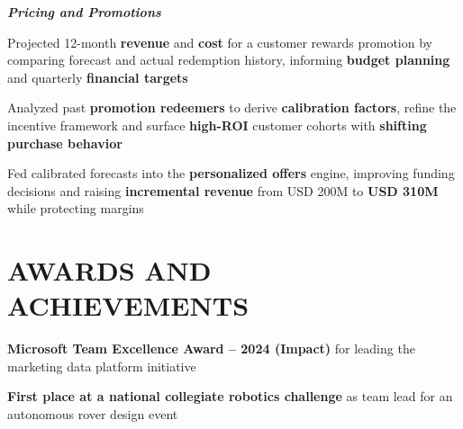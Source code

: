     \vspace{0.15 cm}
    \begin{onecolentry}
        \textit{\textbf{Pricing and Promotions}}
    \end{onecolentry}
    \begin{onecolentry}
        \begin{highlights}
            \item Projected 12-month \textbf{revenue} and \textbf{cost} for a customer rewards promotion by comparing forecast and actual redemption history, informing \textbf{budget planning} and quarterly \textbf{financial targets}
            \item Analyzed past \textbf{promotion redeemers} to derive \textbf{calibration factors}, refine the incentive framework and surface \textbf{high-ROI} customer cohorts with \textbf{shifting purchase behavior}
            \item Fed calibrated forecasts into the \textbf{personalized offers} engine, improving funding decisions and raising \textbf{incremental revenue} from USD 200M to \textbf{USD 310M} while protecting margins
        \end{highlights}
    \end{onecolentry}

    \section{AWARDS AND ACHIEVEMENTS}
    \begin{highlights}
        \item \textbf{Microsoft Team Excellence Award -- 2024 (Impact)} for leading the marketing data platform initiative
        \item \textbf{First place at a national collegiate robotics challenge} as team lead for an autonomous rover design event
    \end{highlights}


